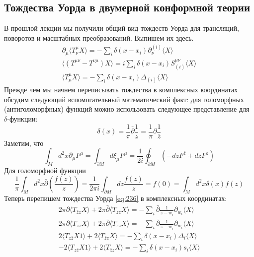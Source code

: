 \documentclass[a4paper,12pt]{article}
\theoremstyle{definition}
\theoremstyle{definition}
\theoremstyle{definition}
\begin{document}
\subsection{Тождества Уорда в двумерной конформной теории}
\label{sec:ward-2d-cft}
В прошлой лекции мы получили общий вид тождеств Уорда для трансляций, поворотов и масштабных преобразований. Выпишем их здесь.
\begin{eqnarray}
  \label{eq:236}
  \partial_{\mu}\langle T^{\mu}_{\nu} X\rangle = -\sum_{i} \delta(x-x_{i}) \partial_{\nu}^{(i)}\langle X\rangle\\
  \langle (T^{\mu\nu}-T^{\nu\mu}) X\rangle =i\sum_{i}\delta(x-x_{i}) S^{\mu\nu}_{(i)}\langle X\rangle\\
  \langle T^{\mu}_{\mu} X\rangle=-\sum_{i}\delta(x-x_{i}) \Delta_{(i)} \langle X\rangle
\end{eqnarray}
Прежде чем мы начнем переписывать тождества в комплексных координатах обсудим следующий вспомогательный математический факт: для голоморфных (антиголоморфных) функций можно использовать следующее представление для $\delta$-функции:
\begin{equation}
  \label{eq:237}
  \delta(x)=\frac{1}{\pi} \bar \partial \frac{1}{z} = \frac{1}{\pi}\partial \frac{1}{\bar z}
\end{equation}
Заметим, что
\begin{equation}
  \label{eq:238}
  \int_{M} d^{2}x \partial_{\mu}F^{\mu}=\int_{\partial M} d\xi_{\mu} F^{\mu}=\frac{1}{2i} \oint_{\partial M} (-dz F^{\bar z}+d\bar z F^{z})
\end{equation}
Для голоморфной функции
\begin{equation}
  \label{eq:239}
  \frac{1}{\pi}\int_{M} d^{2}x \bar \partial\left( \frac{f(z)}{z}\right)=\frac{1}{2\pi i} \int_{\partial M} dz \frac{f(z)}{z}=f(0)=\int_{M} d^{2}x \delta(x) f(z)
\end{equation}
Теперь перепишем тождества Уорда \eqref{eq:236} в комплексных координатах:
\begin{eqnarray}
  \label{eq:240}
  2\pi \partial \langle T_{\bar z z } X\rangle +2\pi \bar \partial \langle T_{zz}X\rangle = -\sum_{i} \bar \partial \frac{1}{z-w_{i}} \partial_{w_{i}} \langle X \rangle\\
  2\pi \partial \langle T_{\bar z \bar z } X\rangle +2\pi \bar \partial \langle T_{z\bar z}X\rangle = -\sum_{i} \bar \partial \frac{1}{\bar z-w_{i}} \partial_{\bar w_{i}} \langle X \rangle\\
  2 \langle T_{z\bar z} X 1\rangle +2 \langle T_{\bar z z }X\rangle =- \sum_{i}\delta(x-x_{i}) \Delta_{i} \langle X\rangle\\
  -2 \langle T_{z\bar z} X 1\rangle +2 \langle T_{\bar z z }X\rangle =- \sum_{i}\delta(x-x_{i}) s_{i} \langle X\rangle\\
\end{eqnarray}
\end{document}
